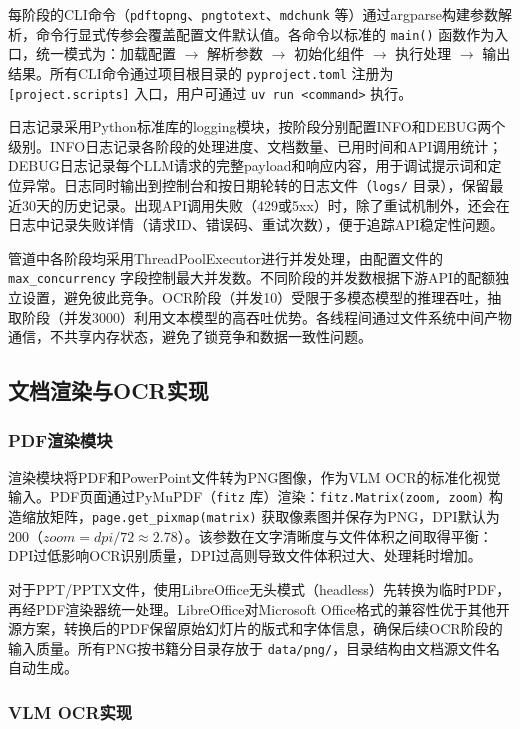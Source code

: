 每阶段的CLI命令（\texttt{pdftopng}、\texttt{pngtotext}、\texttt{mdchunk} 等）通过argparse构建参数解析，命令行显式传参会覆盖配置文件默认值。各命令以标准的 \texttt{main()} 函数作为入口，统一模式为：加载配置 $\to$ 解析参数 $\to$ 初始化组件 $\to$ 执行处理 $\to$ 输出结果。所有CLI命令通过项目根目录的 \texttt{pyproject.toml} 注册为 \texttt{[project.scripts]} 入口，用户可通过 \texttt{uv run <command>} 执行。

日志记录采用Python标准库的logging模块，按阶段分别配置INFO和DEBUG两个级别。INFO日志记录各阶段的处理进度、文档数量、已用时间和API调用统计；DEBUG日志记录每个LLM请求的完整payload和响应内容，用于调试提示词和定位异常。日志同时输出到控制台和按日期轮转的日志文件（\texttt{logs/} 目录），保留最近30天的历史记录。出现API调用失败（429或5xx）时，除了重试机制外，还会在日志中记录失败详情（请求ID、错误码、重试次数），便于追踪API稳定性问题。

管道中各阶段均采用ThreadPoolExecutor进行并发处理，由配置文件的 \texttt{max\_concurrency} 字段控制最大并发数。不同阶段的并发数根据下游API的配额独立设置，避免彼此竞争。OCR阶段（并发10）受限于多模态模型的推理吞吐，抽取阶段（并发3000）利用文本模型的高吞吐优势。各线程间通过文件系统中间产物通信，不共享内存状态，避免了锁竞争和数据一致性问题。

\subsection{文档渲染与OCR实现}

\subsubsection{PDF渲染模块}

渲染模块将PDF和PowerPoint文件转为PNG图像，作为VLM OCR的标准化视觉输入。PDF页面通过PyMuPDF（\texttt{fitz} 库）渲染：\texttt{fitz.Matrix(zoom, zoom)} 构造缩放矩阵，\texttt{page.get\_pixmap(matrix)} 获取像素图并保存为PNG，DPI默认为200（$zoom = dpi / 72 \approx 2.78$）。该参数在文字清晰度与文件体积之间取得平衡：DPI过低影响OCR识别质量，DPI过高则导致文件体积过大、处理耗时增加。

对于PPT/PPTX文件，使用LibreOffice无头模式（headless）先转换为临时PDF，再经PDF渲染器统一处理。LibreOffice对Microsoft Office格式的兼容性优于其他开源方案，转换后的PDF保留原始幻灯片的版式和字体信息，确保后续OCR阶段的输入质量。所有PNG按书籍分目录存放于 \texttt{data/png/}，目录结构由文档源文件名自动生成。

\subsubsection{VLM OCR实现}

